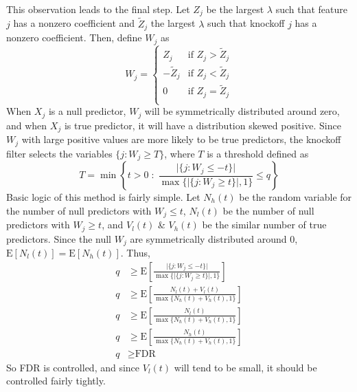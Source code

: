 \documentclass[11pt]{article}
\newcommand{\E}{\mathrm{E}}
\theoremstyle{definition}
\begin{document}
   This observation leads to the final step. Let $Z_j$ be the largest $\lambda$ such that feature $j$ has a nonzero coefficient and $\tilde Z_j$ the largest $\lambda$ such that knockoff $j$ has a nonzero coefficient. Then, define $W_j$ as 
   \[ W_j = \begin{cases}   Z_j         &\mbox{if } Z_j>\tilde Z_j \\ 
                            -\tilde Z_j &\mbox{if } Z_j<\tilde Z_j \\
                            0           &\mbox{if } Z_j=\tilde Z_j \\
            \end{cases} \]
            When $X_j$ is a null predictor, $W_j$ will be symmetrically distributed around zero, and when $X_j$ is true predictor, it will have a distribution skewed positive. Since $W_j$ with large positive values are more likely to be true predictors, the knockoff filter selects the variables $\{j:W_j\geq T\}$, where $T$ is a threshold defined as
            \[ T = \min\left\{ t>0 \;: \; \frac{\vert\{j:W_j\leq -t\}\vert}{\max\{\vert\{j:W_j\geq t\}\vert,1\}}\leq q \right\} \]
            Basic logic of this method is fairly simple. Let $N_h(t)$ be the random variable for the number of null predictors with $W_j\leq t$, $N_l(t)$ be the number of null predictors with $W_j\geq t$, and $V_l(t)$ \& $V_h(t)$ be the similar number of true predictors. Since the null $W_j$ are symmetrically distributed around $0$, $\E[N_l(t)]=\E[N_h(t)]$. Thus,
            \begin{align*}
                q &\geq \E\left[ \frac{\vert\{j:W_j\leq -t\}\vert}{\max\{\vert\{j:W_j\geq t\}\vert,1\}} \right] \\
                q &\geq \E\left[ \frac{N_l(t) + V_l(t)}{\max\{N_h(t) + V_h(t),1\}} \right] \\
                q &\geq \E\left[ \frac{N_l(t)}{\max\{N_h(t) + V_h(t),1\}} \right] \\
                q &\geq \E\left[ \frac{N_h(t)}{\max\{N_h(t) + V_h(t),1\}} \right] \\
                q &\geq \textrm{FDR}
            \end{align*}
            So FDR is controlled, and since $V_l(t)$ will tend to be small, it should be controlled fairly tightly.
\end{document}
